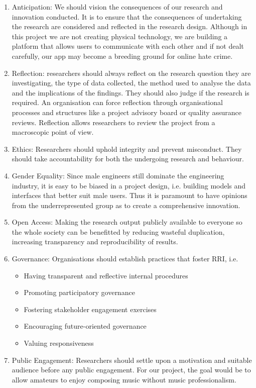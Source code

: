 \begin{enumerate}
    \item Anticipation: We should vision the consequences of our research and innovation conducted. It is to ensure that the consequences of undertaking the research are considered and reflected in the research 
    design. Although in this project we are not creating physical technology, we are building a platform that allows users to communicate with each other and if not dealt carefully, our app may become a breeding 
    ground for online hate crime.
    \item Reflection: researchers should always reflect on the research question they are investigating, the type of data collected, the method used to analyse the data and the implications of the findings.
    They should also judge if the research is required. An organisation can force reflection through organisational processes and structures like a project advisory board or quality assurance reviews. Reflection 
    allows researchers to review the project from a macroscopic point of view.
    \item Ethics: Researchers should uphold integrity and prevent misconduct. They should take accountability for both the undergoing research and behaviour.
    \item Gender Equality: Since male engineers still dominate the engineering industry, it is easy to be biased in a project design, i.e. building models and interfaces that better suit male users. Thus it is 
    paramount to have opinions from the underrepresented group as to create a comprehensive innovation.
    \item Open Access: Making the research output publicly available to everyone so the whole society can be benefitted by reducing wasteful duplication, increasing transparency and reproducibility of results.
    \item Governance: Organisations should establish practices that foster RRI, i.e. 
    \begin{itemize}
        \item Having transparent and reflective internal procedures
        \item Promoting participatory governance
        \item Fostering stakeholder engagement exercises
        \item Encouraging future-oriented governance
        \item Valuing responsiveness
    \end{itemize}
    \item Public Engagement: Researchers should settle upon a motivation and suitable audience before any public engagement. For our project, the goal would be to allow amateurs to enjoy composing music without
    music professionalism.
\end{enumerate}
